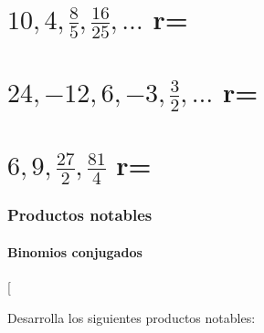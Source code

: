 \documentclass[12pt,addpoints]{repaso}
\begin{document}
\begin{questions}
{\begin{multicols}{3}
\begin{parts}
                \part {\large $10,4,\frac{8}{5}, \frac{16}{25},\dots$ \quad r=\fillin[$\frac{2}{5}$][0cm]}

                \begin{solutionbox}{2cm}
                \end{solutionbox}

                \part {\large $24, -12, 6, -3, \frac{3}{2}, \dots$ \quad r=\fillin[$\frac{1}{2}$][0cm]}

                \begin{solutionbox}{2cm}
                \end{solutionbox}

                \part {\large $6, 9, \frac{27}{2}, \frac{81}{4}$ \quad r=\fillin[$\frac{3}{2}$][0cm]}

                \begin{solutionbox}{2cm}
                \end{solutionbox}
            \end{parts}
        \end{multicols}
    }

    \section{Productos notables}
    \subsection{Binomios conjugados}

    \ejemplosboxed[{Desarrolla los siguientes productos notables:
                \begin{multicols}{2}
\end{multicols}}
\end{questions}
\end{document}
